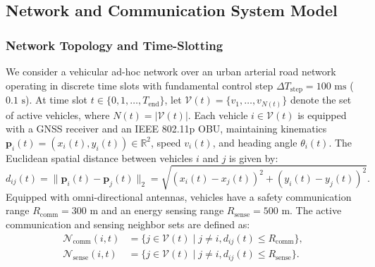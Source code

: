 \documentclass[journal]{IEEEtran}
\begin{document}
\subsection{Network and Communication System Model}
\subsubsection{Network Topology and Time-Slotting}
We consider a vehicular ad-hoc network over an urban arterial road network operating in discrete time slots with fundamental control step $\Delta T_{\text{step}} = 100\text{ ms}$ ($0.1\text{ s}$). At time slot $t \in \{0, 1, \dots, T_{\text{end}}\}$, let $\mathcal{V}(t) = \{v_1, \dots, v_{N(t)}\}$ denote the set of active vehicles, where $N(t) = |\mathcal{V}(t)|$. Each vehicle $i \in \mathcal{V}(t)$ is equipped with a GNSS receiver and an IEEE 802.11p OBU, maintaining kinematics $\mathbf{p}_i(t) = (x_i(t), y_i(t)) \in \mathbb{R}^2$, speed $v_i(t)$, and heading angle $\theta_i(t)$. The Euclidean spatial distance between vehicles $i$ and $j$ is given by:
\begin{equation}
\label{eq:distance}
d_{ij}(t) = \|\mathbf{p}_i(t) - \mathbf{p}_j(t)\|_2 = \sqrt{(x_i(t) - x_j(t))^2 + (y_i(t) - y_j(t))^2}.
\end{equation}
Equipped with omni-directional antennas, vehicles have a safety communication range $R_{\text{comm}} = 300\text{ m}$ and an energy sensing range $R_{\text{sense}} = 500\text{ m}$. The active communication and sensing neighbor sets are defined as:
\begin{align}
\label{eq:neighbors}
\mathcal{N}_{\text{comm}}(i, t) &= \{j \in \mathcal{V}(t) \mid j \neq i, d_{ij}(t) \le R_{\text{comm}}\}, \\
\mathcal{N}_{\text{sense}}(i, t) &= \{j \in \mathcal{V}(t) \mid j \neq i, d_{ij}(t) \le R_{\text{sense}}\}.
\end{align}
\end{document}
